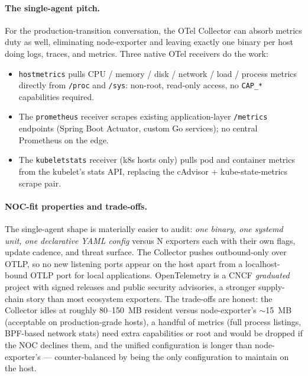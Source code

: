 \documentclass[11pt,a4paper,oneside]{report}
\begin{document}
\paragraph{The single-agent pitch.}
For the production-transition conversation, the OTel Collector
can absorb metrics duty as well, eliminating node-exporter and
leaving exactly one binary per host doing logs, traces, and
metrics. Three native OTel receivers do the work:

\begin{itemize}
  \item \texttt{hostmetrics} pulls CPU / memory / disk / network /
        load / process metrics directly from \texttt{/proc} and
        \texttt{/sys}: non-root, read-only access, no
        \texttt{CAP\_*} capabilities required.
  \item The \texttt{prometheus} receiver scrapes existing
        application-layer \texttt{/metrics} endpoints (Spring Boot
        Actuator, custom Go services); no central Prometheus on
        the edge.
  \item The \texttt{kubeletstats} receiver (k8s hosts only) pulls
        pod and container metrics from the kubelet's stats API,
        replacing the cAdvisor + kube-state-metrics scrape pair.
\end{itemize}

\paragraph{NOC-fit properties and trade-offs.}
The single-agent shape is materially easier to audit: \emph{one
binary, one systemd unit, one declarative YAML config} versus N
exporters each with their own flags, update cadence, and threat
surface. The Collector pushes outbound-only over OTLP, so no new
listening ports appear on the host apart from a localhost-bound
OTLP port for local applications. OpenTelemetry is a CNCF
\emph{graduated} project with signed releases and public security
advisories, a stronger supply-chain story than most ecosystem
exporters. The trade-offs are honest: the Collector idles at
roughly 80--150~MB resident versus node-exporter's $\sim$15~MB
(acceptable on production-grade hosts), a handful of metrics
(full process listings, BPF-based network stats) need extra
capabilities or root and would be dropped if the NOC declines
them, and the unified configuration is longer than
node-exporter's --- counter-balanced by being the only
configuration to maintain on the host.
\end{document}
